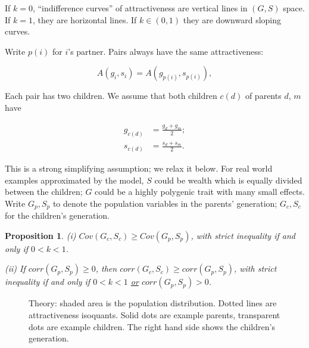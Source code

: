 \documentclass[
]{article}
\newtheorem{prop}{Proposition}
\begin{document}
If \(k = 0\), ``indifference curves'' of attractiveness are vertical lines
in \((G, S)\) space. If \(k = 1\), they are horizontal lines. If
\(k \in (0,1)\) they are downward sloping curves.

Write \(p(i)\) for \(i\)'s partner. Pairs always have the same
attractiveness:

\begin{equation}
A(g_{i},s_{i}) = A(g_{p(i)},s_{p(i)}),
\label{eq:same-A}
\end{equation}

Each pair has two children. We assume that both children \(c(d)\) of
parents \(d\), \(m\) have

\begin{align}
g_{c(d)} & =\frac{g_{d}+g_{m}}{2};\label{eq:children-average}\\
s_{c(d)} & =\frac{s_{d}+s_{m}}{2}.\nonumber 
\end{align}

This is a strong simplifying assumption; we relax it below. For real
world examples approximated by the model, \(S\) could be wealth which is
equally divided between the children; \(G\) could be a highly polygenic
trait with many small effects. Write \(G_{p}, S_{p}\) to denote the
population variables in the parents' generation; \(G_{c}, S_{c}\) for the
children's generation.

\begin{prop}
\label{prop:prop1}
(i) $Cov(G_{c}, S_{c}) \ge Cov(G_{p},S_{p})$, with strict inequality
if and only if $0 < k < 1$. 

(ii) If $corr(G_{p}, S_{p}) \ge 0$, then $corr(G_{c},S_{c}) \ge corr(G_{p},S_{p})$,
with strict inequality if and only if $0 < k < 1$ \uline{or} 
$corr(G_{p}, S_{p}) > 0$.
\end{prop}

\begin{figure}

{\centering {}\newline{}\newline{}

}

\caption{Theory: shaded area is the population distribution. Dotted lines are attractiveness isoquants. Solid dots are example parents, transparent dots are example children. The right hand side shows the children's generation.}\label{fig:pic-intuition}
\end{figure}
\end{document}
